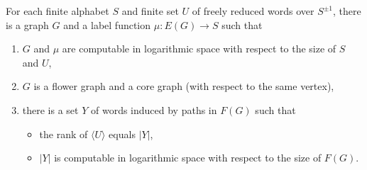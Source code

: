 \documentclass{article}
\newcommand{\gen}[1]{\langle #1 \rangle}
\newcommand{\Spm}{S^{\pm1}}
\begin{document}
\begin{lemma}\label{lem:main}
  For each finite alphabet $S$ and finite set $U$ of freely reduced words over $\Spm$, there is a graph $G$ and a label function $\mu \colon E(G) \to S$ such that
  \begin{enumerate}
  \item $G$ and $\mu$ are computable in logarithmic space with respect to the size of $S$ and $U$,
  \item $G$ is a flower graph and a core graph (with respect to the same vertex),
  \item there is a set $Y$ of words induced by paths in $F(G)$ such that
    \begin{itemize}
    \item the rank of $\gen{U}$ equals $|Y|$,
    \item $|Y|$ is computable in logarithmic space with respect to the size of $F(G)$.
    \end{itemize}
  \end{enumerate}
\end{lemma}
\end{document}
